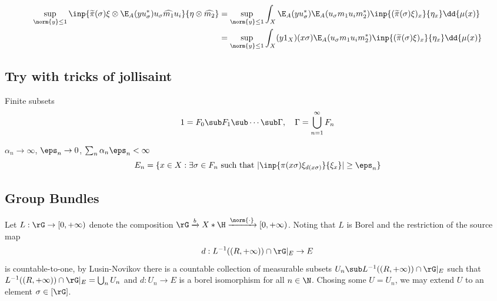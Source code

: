 \documentclass[../main.tex]{subfiles}
\begin{document}
\begin{align*}
    \sup_{\norm{y}\leq1}\inp{\widetilde{\pi}(\sigma) \xi \otimes  \E_{A}(y u_{\sigma}^{*})u_{\sigma} \widehat{m_{1}} u_{i}}{ \eta \otimes \widehat{m_{2}}} &= \sup_{\norm{y}\leq1}\int_{X}\E_{A}(yu_{\sigma}^{*})\E_{A}(u_{\sigma}m_{1}u_{i}m_{2}^{*}) \inp{(\widetilde{\pi}(\sigma) \xi)_{x}}{\eta_{x}}\dd{\mu(x)}\\
    &= \sup_{\norm{y}\leq1}\int_{X}(y1_X)(x \sigma)\E_{A}(u_{\sigma}m_{1}u_{i}m_{2}^{*}) \inp{(\widetilde{\pi}(\sigma) \xi)_{x}}{\eta_{x}}\dd{\mu(x)}\\
\end{align*}



\subsection{Try with tricks of jollisaint}
Finite subsets
\[
    1=F_{0}\sub F_{1}\sub \cdots \sub \Gamma,\quad \Gamma=\bigcup_{n=1}^{\infty}F_{n}
\]

$ \alpha_{n}\to \infty $, $ \eps_{n}\to 0 $, $ \sum_{n} \alpha_{n} \eps_{n}<\infty $
\[
    E_{n}=\{x\in X: \exists  \sigma\in F_{n} \text{ such that } | \inp{\pi(x \sigma) \xi_{d(x \sigma)}}{\xi_{x}}|\geq \eps_{n} \}
\]

\subsection{Group Bundles}

Let $ L:\rG\to [0,+\infty) $ denote the composition $ \rG \xrightarrow{b} X\ast \H \xrightarrow{\norm{\cdot}} [0,+\infty) $. Noting that $ L $ is Borel and the restriction of the source map
\[
    d: L^{-1}((R,+\infty))\cap \rG\vert_{E} \to E
\]
is countable-to-one, by Lusin-Novikov there is a countable collection of measurable subsets $ U_{n}\sub L^{-1}((R,+\infty))\cap \rG\vert_{E}  $ such that $ L^{-1}((R,+\infty))\cap \rG\vert_{E} =\bigcup_{n}U_{n} $ and $ d:U_{n}\to E $ is a borel isomorphism for all $ n\in \N $. Chosing some $ U = U_{n} $, we may extend $ U $ to an element $ \sigma\in [\rG] $.
\end{document}
